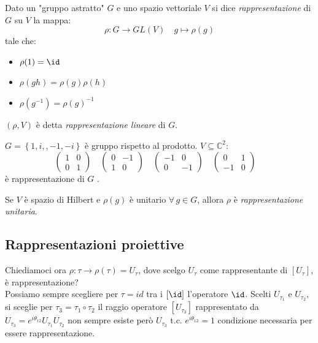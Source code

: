 \begin{definition}
    Dato un "gruppo astratto" \(G\) e uno spazio vettoriale \(V\) si dice \textit{rappresentazione} di \(G\) su \(V\) la mappa:
    \begin{equation}
        \rho: G \to GL(V) \quad g \mapsto \rho(g)
    \end{equation}
    tale che:
    \begin{itemize}
        \item \(\rho(1)= \id\)
        \item \(\rho(gh)= \rho(g)\rho(h)\)
        \item \(\rho(g^{-1}) = \rho(g)^{-1}\)
    \end{itemize}
    \((\rho, V)\) è detta \textit{rappresentazione lineare } di \(G\).
\end{definition}

\begin{example}
    \(G= \left\{ 1,i,,-1,-i \right\}\) è gruppo rispetto al prodotto. \(V \subseteq \mathbb{C}^2: \)
    \[
        \begin{pmatrix}
            1&0\\0&1
        \end{pmatrix} \quad
        \begin{pmatrix}
            0&-1\\1&0
        \end{pmatrix} \quad
        \begin{pmatrix}
            -1&0\\0&-1
        \end{pmatrix} \quad
        \begin{pmatrix}
            0&1\\-1&0
        \end{pmatrix} \quad
    \]
    è rappresentazione di \(G\) .
\end{example}


Se \(V\) è spazio di Hilbert e \(\rho(g)\) è unitario \(\forall \, g \in G\), allora \(\rho\) è \textit{rappresentazione unitaria}.

\subsection{Rappresentazioni proiettive}

Chiediamoci ora \(\rho: \tau\to \rho(\tau)= U_\tau\), dove scelgo \(U_\tau \) come rappresentante di \(\left[ U_\tau \right]\), è rappresentazione?\\
Possiamo sempre scegliere per \(\tau = id\) tra i \(\left[ \id \right] \) l'operatore \(\id\). Scelti \(U_{\tau_1}\) e \(U_{\tau_2}\),
si sceglie per \(\tau_3 =\tau_1 \circ \tau_2 \) il raggio operatore \(\left[ U_{\tau_3} \right]\) rappresentato da \(U_{\tau_3}= e^{i\theta_{12}}U_{\tau_1}U_{\tau_2}\)
non sempre esiste però \(U_{\tau_3}\) t.c. \(e^{i\theta_{12}}=1\) condizione necessaria per essere rappresentazione.

